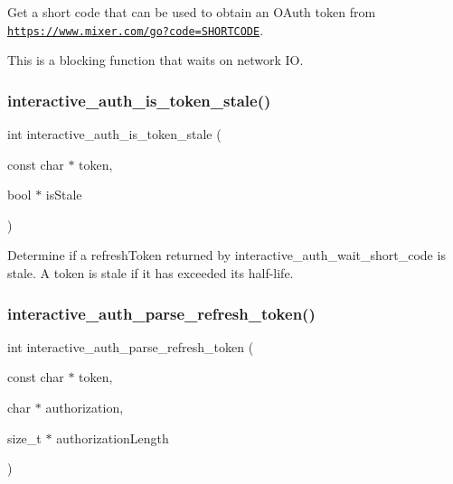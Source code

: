 Get a short code that can be used to obtain an O\+Auth token from {\ttfamily \href{https://www.mixer.com/go?code=SHORTCODE}{\tt https\+://www.\+mixer.\+com/go?code=\+S\+H\+O\+R\+T\+C\+O\+DE}}. 

This is a blocking function that waits on network IO. \mbox{\label{group__interactivity_gadc0bce85838a4ef26479f05cee15ce3f}} 
\subsubsection{\texorpdfstring{interactive\+\_\+auth\+\_\+is\+\_\+token\+\_\+stale()}{interactive\_auth\_is\_token\_stale()}}
{\footnotesize\ttfamily int interactive\+\_\+auth\+\_\+is\+\_\+token\+\_\+stale (\begin{DoxyParamCaption}\item[{const char $\ast$}]{token,  }\item[{bool $\ast$}]{is\+Stale }\end{DoxyParamCaption})}



Determine if a {\ttfamily refresh\+Token} returned by {\ttfamily interactive\+\_\+auth\+\_\+wait\+\_\+short\+\_\+code} is stale. A token is stale if it has exceeded its half-\/life. 

\mbox{\label{group__interactivity_gaebcb6d12678db4826f74b36bf3cb9763}} 
\subsubsection{\texorpdfstring{interactive\+\_\+auth\+\_\+parse\+\_\+refresh\+\_\+token()}{interactive\_auth\_parse\_refresh\_token()}}
{\footnotesize\ttfamily int interactive\+\_\+auth\+\_\+parse\+\_\+refresh\+\_\+token (\begin{DoxyParamCaption}\item[{const char $\ast$}]{token,  }\item[{char $\ast$}]{authorization,  }\item[{size\+\_\+t $\ast$}]{authorization\+Length }\end{DoxyParamCaption})}



